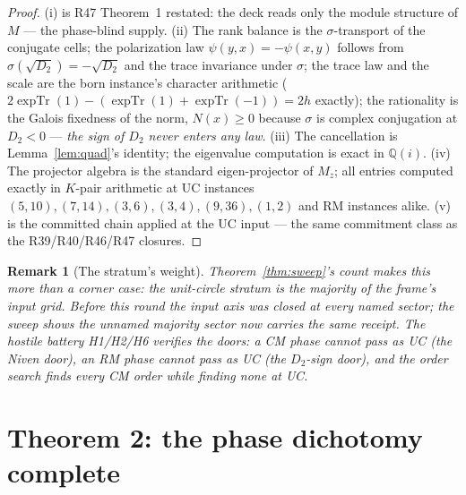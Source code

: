 \documentclass[11pt]{article}
\newcommand{\Q}{\mathbb Q}
\newcommand{\expTr}{\operatorname{expTr}}
\newtheorem{remark}[theorem]{Remark}
\begin{document}
\begin{proof}
(i) is R47 Theorem~1 restated: the deck reads only the module
structure of $M$ --- the phase-blind supply. (ii) The rank balance is
the $\sigma$-transport of the conjugate cells; the polarization law
$\psi(y,x)=-\psi(x,y)$ follows from
$\sigma(\sqrt{D_2})=-\sqrt{D_2}$ and the trace invariance under
$\sigma$; the trace law and the scale are the born instance's
character arithmetic ($2\expTr(1)-(\expTr(1)+\expTr(-1))=2h$
exactly); the rationality is the Galois fixedness of the norm,
$N(x)\ge0$ because $\sigma$ is complex conjugation at $D_2<0$ ---
\emph{the sign of $D_2$ never enters any law}. (iii) The cancellation
is Lemma~\ref{lem:quad}'s identity; the eigenvalue computation is
exact in $\Q(i)$. (iv) The projector algebra is the standard
eigen-projector of $M_z$; all entries computed exactly in $K$-pair
arithmetic at UC instances $(5,10),(7,14),(3,6),(3,4),(9,36),(1,2)$
and RM instances alike. (v) is the committed chain applied at the UC
input --- the same commitment class as the R39/R40/R46/R47 closures.
\end{proof}

\begin{remark}[The stratum's weight]
Theorem~\ref{thm:sweep}'s count makes this more than a corner case:
the unit-circle stratum is the \emph{majority} of the frame's input
grid. Before this round the input axis was closed at every
\emph{named} sector; the sweep shows the unnamed majority sector now
carries the same receipt. The hostile battery H1/H2/H6 verifies the
doors: a CM phase cannot pass as UC (the Niven door), an RM phase
cannot pass as UC (the $D_2$-sign door), and the order search finds
every CM order while finding none at UC.
\end{remark}

\section{Theorem 2: the phase dichotomy complete}
\end{document}
